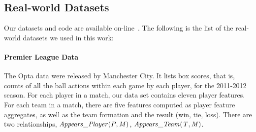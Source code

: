 {%
	
		

\subsection{Real-world Datasets}\label{sec:real}  Our datasets and code are available on-line~\citep{url}. The following is the list of the real-world datasets we used in this work:
				\paragraph{Premier League Data} 
				The Opta data were released by Manchester City. 
				It lists box scores, that is, counts of all the ball actions within each game by each player, for the 2011-2012 season. 
				For each player in a match, our data set contains eleven player features.
				For each team in a match, there are five features computed as player feature aggregates, as well as the team formation and the result (win, tie, loss). 
				There are two relationships, $\it{Appears\_Player}(P,M)$, $\it{Appears\_Team}(T,M)$. 
				
}
